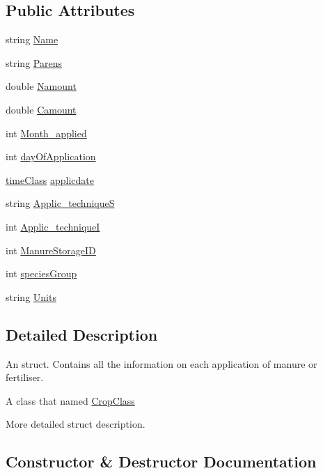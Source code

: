 \subsection*{Public Attributes}
\begin{DoxyCompactItemize}
\item 
string \mbox{\hyperlink{classfert_record_a04116c39447ca7dba821361c530b23f9}{Name}}
\item 
string \mbox{\hyperlink{classfert_record_a4581cecf1c4f53b6809c7878c5ea75ff}{Parens}}
\item 
double \mbox{\hyperlink{classfert_record_a60a97d66e846afeb5e5b6425d89b2427}{Namount}}
\item 
double \mbox{\hyperlink{classfert_record_a7f27f6a12e169928db44a8bb073dca7d}{Camount}}
\item 
int \mbox{\hyperlink{classfert_record_aa387b8011b0ad697b1d8ab0ee821a425}{Month\+\_\+applied}}
\item 
int \mbox{\hyperlink{classfert_record_a999d28e9fac11717726d469ffefe0292}{day\+Of\+Application}}
\item 
\mbox{\hyperlink{classtime_class}{time\+Class}} \mbox{\hyperlink{classfert_record_abb3dcc8fe64aef946d15be6992bc0622}{applicdate}}
\item 
string \mbox{\hyperlink{classfert_record_af8971d0933ac0e105cff348940b15e72}{Applic\+\_\+techniqueS}}
\item 
int \mbox{\hyperlink{classfert_record_acd5d93cefcdeac346e4f2da0d794b02e}{Applic\+\_\+techniqueI}}
\item 
int \mbox{\hyperlink{classfert_record_a91e455f4ce8924187f4351359f1c0be7}{Manure\+Storage\+ID}}
\item 
int \mbox{\hyperlink{classfert_record_a771d65e534ff875346acaadb64052ae6}{species\+Group}}
\item 
string \mbox{\hyperlink{classfert_record_a9a4acd1daa3940bca690a0dd8a939cdb}{Units}}
\end{DoxyCompactItemize}


\subsection{Detailed Description}
An struct. Contains all the information on each application of manure or fertiliser. 

A class that named \mbox{\hyperlink{class_crop_class}{Crop\+Class}}

More detailed struct description. 

\subsection{Constructor \& Destructor Documentation}
\mbox{\label{classfert_record_aec62ffe21df97c2b28e3c0c37a113d33}} 
